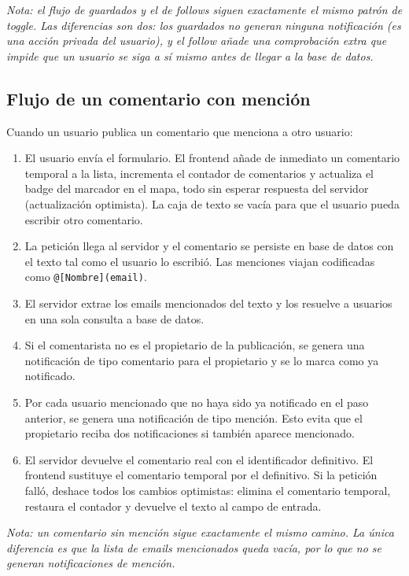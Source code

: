 \smallskip
\noindent\textit{Nota: el flujo de guardados y el de follows siguen exactamente el mismo patrón de toggle. Las diferencias son dos: los guardados no generan ninguna notificación (es una acción privada del usuario), y el follow añade una comprobación extra que impide que un usuario se siga a sí mismo antes de llegar a la base de datos.}

\subsection*{Flujo de un comentario con mención}

Cuando un usuario publica un comentario que menciona a otro usuario:

\begin{enumerate}
    \item El usuario envía el formulario. El frontend añade de inmediato un comentario temporal a la lista, incrementa el contador de comentarios y actualiza el badge del marcador en el mapa, todo sin esperar respuesta del servidor (actualización optimista). La caja de texto se vacía para que el usuario pueda escribir otro comentario.
    \item La petición llega al servidor y el comentario se persiste en base de datos con el texto tal como el usuario lo escribió. Las menciones viajan codificadas como \texttt{@[Nombre](email)}.
    \item El servidor extrae los emails mencionados del texto y los resuelve a usuarios en una sola consulta a base de datos.
    \item Si el comentarista no es el propietario de la publicación, se genera una notificación de tipo comentario para el propietario y se lo marca como ya notificado.
    \item Por cada usuario mencionado que no haya sido ya notificado en el paso anterior, se genera una notificación de tipo mención. Esto evita que el propietario reciba dos notificaciones si también aparece mencionado.
    \item El servidor devuelve el comentario real con el identificador definitivo. El frontend sustituye el comentario temporal por el definitivo. Si la petición falló, deshace todos los cambios optimistas: elimina el comentario temporal, restaura el contador y devuelve el texto al campo de entrada.
\end{enumerate}

\smallskip
\noindent\textit{Nota: un comentario sin mención sigue exactamente el mismo camino. La única diferencia es que la lista de emails mencionados queda vacía, por lo que no se generan notificaciones de mención.}

